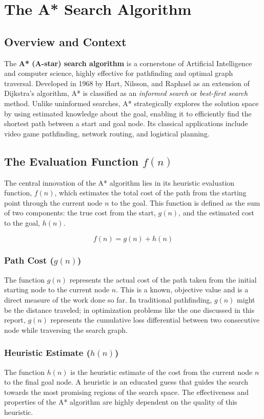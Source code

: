 
\chapter{The A* Search Algorithm}
\label{chap:astar_intro}

\section{Overview and Context}
The \textbf{A* (A-star) search algorithm} is a cornerstone of Artificial Intelligence and computer science, highly effective for pathfinding and optimal graph traversal. Developed in 1968 by Hart, Nilsson, and Raphael as an extension of Dijkstra's algorithm, A* is classified as an \textit{informed search} or \textit{best-first search} method. Unlike uninformed searches, A* strategically explores the solution space by using estimated knowledge about the goal, enabling it to efficiently find the shortest path between a start and goal node. Its classical applications include video game pathfinding, network routing, and logistical planning.

\section{The Evaluation Function $f(n)$}
The central innovation of the A* algorithm lies in its heuristic evaluation function, $f(n)$, which estimates the total cost of the path from the starting point through the current node $n$ to the goal. This function is defined as the sum of two components: the true cost from the start, $g(n)$, and the estimated cost to the goal, $h(n)$.

$$f(n) = g(n) + h(n)$$

\subsection{Path Cost ($g(n)$)}
The function $g(n)$ represents the actual cost of the path taken from the initial starting node to the current node $n$. This is a known, objective value and is a direct measure of the work done so far. In traditional pathfinding, $g(n)$ might be the distance traveled; in optimization problems like the one discussed in this report, $g(n)$ represents the cumulative loss differential between two consecutive node while traversing the search graph.

\subsection{Heuristic Estimate ($h(n)$)}
The function $h(n)$ is the heuristic estimate of the cost from the current node $n$ to the final goal node. A heuristic is an educated guess that guides the search towards the most promising regions of the search space. The effectiveness and properties of the A* algorithm are highly dependent on the quality of this heuristic.

